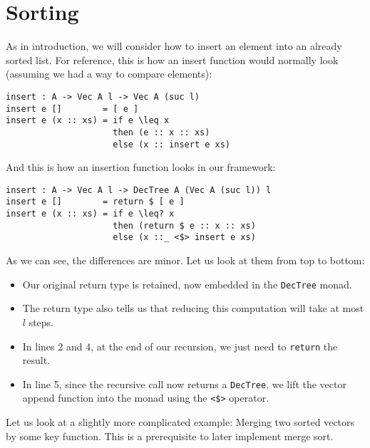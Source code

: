 
\section{Sorting}

As in introduction, we will consider how to insert an element into an already sorted list. For reference, this is how an insert function would normally look (assuming we had a way to compare elements):

\begin{lstlisting}[caption={Plain Insertion},label={lst:insert:plain},emph={insert, if, then, else}]
insert : A -> Vec A l -> Vec A (suc l)
insert e []        = [ e ]
insert e (x :: xs) = if e \leq x
                     then (e :: x :: xs)
                     else (x :: insert e xs)
\end{lstlisting}

And this is how an insertion function looks in our framework:

\begin{lstlisting}[caption={Insertion With Runtime Bound},label={lst:insert:bounded},emph={insert,if,then,else,return}]
insert : A -> Vec A l -> DecTree A (Vec A (suc l)) l
insert e []        = return $ [ e ]
insert e (x :: xs) = if e \leq? x
                     then (return $ e :: x :: xs)
                     else (x ::_ <$> insert e xs)
\end{lstlisting}

As we can see, the differences are minor. Let us look at them from top to bottom:

\begin{itemize}
    \item Our original return type is retained, now embedded in the \texttt{DecTree} monad.
    \item The return type also tells us that reducing this computation will take at most $l$ steps.
    \item In lines 2 and 4, at the end of our recursion, we just need to \texttt{return} the result.
    \item In line 5, since the recursive call now returns a \texttt{DecTree}, we lift the vector append function into the monad using the \texttt{<\$>} operator.
\end{itemize}

Let us look at a slightly more complicated example: Merging two sorted vectors by some key function. This is a prerequisite to later implement merge sort.

